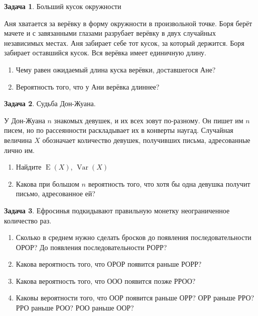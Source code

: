 \documentclass[nobib]{tufte-handout}
\theoremstyle{definition}
\newtheorem{problem}{Задача}
\DeclareMathOperator{\Var}{Var}
\DeclareMathOperator{\E}{E}
\begin{document}
\begin{problem}
Больший кусок окружности

Аня хватается за верёвку в форму окружности в произвольной точке. Боря берёт мачете и с завязанными глазами разрубает верёвку в двух случайных независимых местах. Аня забирает себе тот кусок, за который держится. Боря забирает оставшийся кусок.  Вся верёвка имеет единичную длину.
\begin{enumerate}
\item Чему равен ожидаемый длина куска верёвки, доставшегося Ане?
\item  Вероятность того, что у Ани верёвка длиннее?
\end{enumerate}


\end{problem}


\begin{problem}
Судьба Дон-Жуана.

У Дон-Жуана $n$  знакомых девушек, и их всех зовут по-разному. Он пишет
им $n$  писем, но по рассеянности раскладывает их в конверты
наугад. Случайная величина $X$ обозначает количество девушек, получивших письма, адресованные лично им.

\begin{enumerate}
\item Найдите $\E(X)$, $\Var(X)$
\item Какова при большом $n$ вероятность того, что хотя бы одна девушка получит письмо, адресованное ей?
\end{enumerate}


\end{problem}


\begin{problem}
Ефросинья подкидывают правильную монетку неограниченное количество раз.

\begin{enumerate}
\item Сколько в среднем нужно сделать бросков до появления последовательности ОРОР? До появления последовательности РОРР?
\item Какова вероятность того, что ОРОР появится раньше РОРР?
\item Какова вероятность того, что ООО появится позже РРОО?
\item Каковы вероятности того, что ООР появится раньше ОРР? ОРР раньше РРО? РРО раньше РОО? РОО раньше ООР?
\end{enumerate}

\end{problem}
\end{document}
